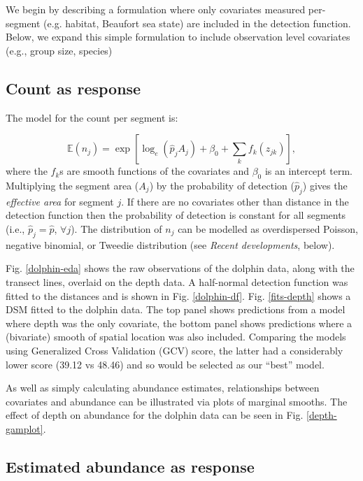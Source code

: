 \documentclass[a4paper,12pt]{article}
\begin{document}
We begin by describing a formulation where only covariates measured per-segment (e.g. habitat, Beaufort sea state) are included in the detection function. Below, we expand this simple formulation to include observation level covariates (e.g., group size, species)

\subsection*{Count as response}

The model for the count per segment is:

\begin{equation*}
\mathbb{E}(n_j) = \exp\left[ \log_e \left( \hat{p}_j A_j \right) + \beta_0 + \sum_k f_k\left(z_{jk}\right) \right],
\end{equation*}
where the $f_k$s are smooth functions of the covariates and $\beta_0$ is an intercept term. Multiplying the segment area ($A_j$) by the probability of detection ($\hat{p}_j$) gives the \textit{effective area} for segment $j$. If there are no covariates other than distance in the detection function then the probability of detection is constant for all segments (i.e., $\hat{p}_j=\hat{p}$, $\forall j$). The distribution of $n_j$ can be modelled as overdispersed Poisson, negative binomial, or Tweedie distribution (see \textit{Recent developments}, below).

Fig. \ref{dolphin-eda} shows the raw observations of the dolphin data, along with the transect lines, overlaid on the depth data. A half-normal detection function was fitted to the distances and is shown in Fig. \ref{dolphin-df}. Fig. \ref{fits-depth} shows a DSM fitted to the dolphin data. The top panel shows predictions from a model where depth was the only covariate, the bottom panel shows predictions where a (bivariate) smooth of spatial location was also included. Comparing the models using Generalized Cross Validation (GCV) score, the latter had a considerably lower score (39.12 vs 48.46) and so would be selected as our ``best'' model. 

As well as simply calculating abundance estimates, relationships between covariates and abundance can be illustrated via plots of marginal smooths. The effect of depth on abundance for the dolphin data can be seen in Fig. \ref{depth-gamplot}. 

\subsection*{Estimated abundance as response}
\end{document}
